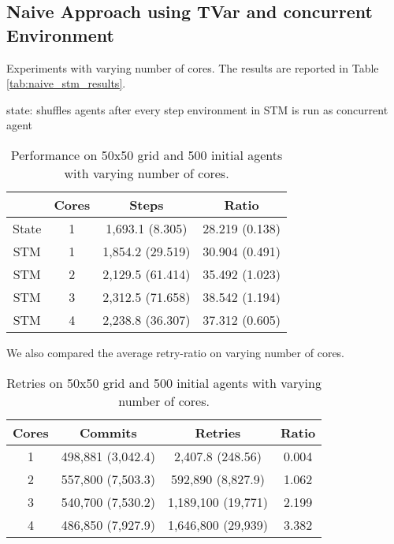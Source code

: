 \subsection{Naive Approach using TVar and concurrent Environment}
Experiments with varying number of cores. The results are reported in Table \ref{tab:naive_stm_results}.

state: shuffles agents after every step
environment in STM is run as concurrent agent

\begin{table}
	\centering
  	\begin{tabular}{ c || c | c | c }
               & Cores & Steps            & Ratio          \\ \hline \hline 
    	State  & 1     & 1,693.1 (8.305)  & 28.219 (0.138) \\ \hline \hline
   		STM    & 1     & 1,854.2 (29.519) & 30.904 (0.491) \\ \hline
   		STM    & 2     & 2,129.5 (61.414) & 35.492 (1.023) \\ \hline
   		STM    & 3     & 2,312.5 (71.658) & 38.542 (1.194) \\ \hline
   		STM    & 4     & 2,238.8 (36.307) & 37.312 (0.605) \\ \hline
   	\end{tabular}
  	
  	\caption{Performance on 50x50 grid and 500 initial agents with varying number of cores.}
	\label{tab:naive_results_time}
\end{table}

We also compared the average retry-ratio on varying number of cores.

\begin{table}
	\centering
  	\begin{tabular}{ c || c | c | c }
        Cores & Commits           & Retries            & Ratio \\ \hline \hline 
    	1     & 498,881 (3,042.4) & 2,407.8 (248.56)   & 0.004 \\ \hline
   		2     & 557,800 (7,503.3) & 592,890 (8,827.9)  & 1.062 \\ \hline
   		3     & 540,700 (7,530.2) & 1,189,100 (19,771) & 2.199 \\ \hline
   		4     & 486,850 (7,927.9) & 1,646,800 (29,939) & 3.382 \\ \hline
   	\end{tabular}
  	
  	\caption{Retries on 50x50 grid and 500 initial agents with varying number of cores.}
	\label{tab:naive_results_retries}
\end{table}

